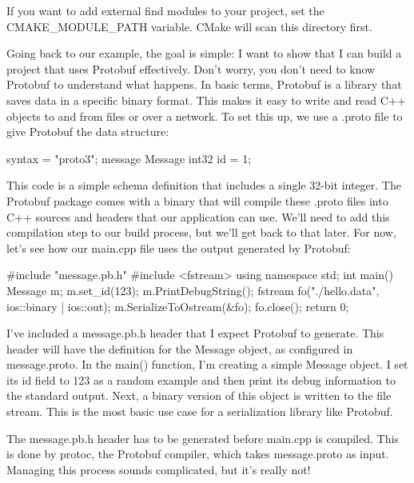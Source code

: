If you want to add external find modules to your project, set the CMAKE\_MODULE\_PATH variable. CMake will scan this directory first.

Going back to our example, the goal is simple: I want to show that I can build a project that uses Protobuf effectively. Don’t worry, you don’t need to know Protobuf to understand what happens. In basic terms, Protobuf is a library that saves data in a specific binary format. This makes it easy to write and read C++ objects to and from files or over a network. To set this up, we use a .proto file to give Protobuf the data structure:


\begin{shell}
syntax = "proto3";
message Message {
    int32 id = 1;
}
\end{shell}

This code is a simple schema definition that includes a single 32-bit integer. The Protobuf package comes with a binary that will compile these .proto files into C++ sources and headers that our application can use. We’ll need to add this compilation step to our build process, but we’ll get back to that later. For now, let’s see how our main.cpp file uses the output generated by Protobuf:


\begin{cpp}
#include "message.pb.h"
#include <fstream>
using namespace std;
int main()
{
    Message m;
    m.set_id(123);
    m.PrintDebugString();
    fstream fo("./hello.data", ios::binary | ios::out);
    m.SerializeToOstream(&fo);
    fo.close();
    return 0;
}
\end{cpp}

I’ve included a message.pb.h header that I expect Protobuf to generate. This header will have the definition for the Message object, as configured in message.proto. In the main() function, I’m creating a simple Message object. I set its id field to 123 as a random example and then print its debug information to the standard output. Next, a binary version of this object is written to the file stream. This is the most basic use case for a serialization library like Protobuf.

The message.pb.h header has to be generated before main.cpp is compiled. This is done by protoc, the Protobuf compiler, which takes message.proto as input. Managing this process sounds complicated, but it’s really not!

